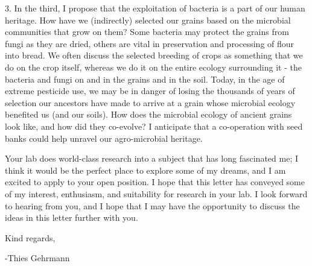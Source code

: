 \documentclass[letterpaper, 10pt]{article} %
\begin{document}
\begin{tcolorbox}[
	blanker,
	width=0.95\textwidth,
	enlarge left by=0.025\textwidth,
	enlarge right by=0.025\textwidth,
	before skip=6pt,
	breakable]
3. In the third, I propose that the exploitation of bacteria is a part of our human heritage. How have we (indirectly) selected our grains based on the microbial communities that grow on them? Some bacteria may protect the grains from fungi as they are dried, others are vital in preservation and processing of flour into bread. We often discuss the selected breeding of crops as something that we do on the crop itself, whereas we do it on the entire ecology surrounding it - the bacteria and fungi on and in the grains and in the soil. Today, in the age of extreme pesticide use, we may be in danger of losing the thousands of years of selection our ancestors have made to arrive at a grain whose microbial ecology benefited us (and our soils). How does the microbial ecology of ancient grains look like, and how did they co-evolve? I anticipate that a co-operation with seed banks could help unravel our agro-microbial heritage.

Your lab does world-class research into a subject that has long fascinated me; I think it would be the perfect place to explore some of my dreams, and I am excited to apply to your open position.
I hope that this letter has conveyed some of my interest, enthusiasm, and suitability for research in your lab. I look forward to hearing from you, and I hope that I may have the opportunity to discuss the ideas in this letter further with you.

Kind regards,

-Thies Gehrmann
\end{tcolorbox}



\thispagestyle{empty}
\end{document}
